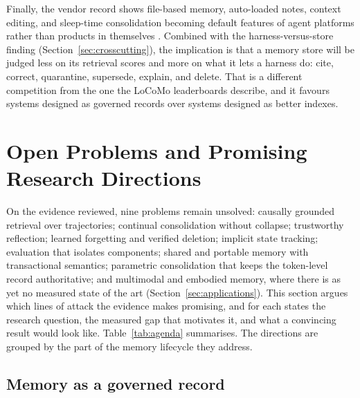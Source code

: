 \documentclass[11pt]{article}
\begin{document}
Finally, the vendor record shows file-based memory, auto-loaded notes, context editing, and sleep-time consolidation becoming default features of agent platforms rather than products in themselves \citep{anthropic2025memorytool,anthropic2026claudecode,letta2025filesystem}. Combined with the harness-versus-store finding (Section~\ref{sec:crosscutting}), the implication is that a memory store will be judged less on its retrieval scores and more on what it lets a harness do: cite, correct, quarantine, supersede, explain, and delete. That is a different competition from the one the LoCoMo leaderboards describe, and it favours systems designed as governed records over systems designed as better indexes.

\section{Open Problems and Promising Research Directions}
\label{sec:directions}

On the evidence reviewed, nine problems remain unsolved: causally grounded retrieval over trajectories; continual consolidation without collapse; trustworthy reflection; learned forgetting and verified deletion; implicit state tracking; evaluation that isolates components; shared and portable memory with transactional semantics; parametric consolidation that keeps the token-level record authoritative; and multimodal and embodied memory, where there is as yet no measured state of the art (Section~\ref{sec:applications}). This section argues which lines of attack the evidence makes promising, and for each states the research question, the measured gap that motivates it, and what a convincing result would look like. Table~\ref{tab:agenda} summarises. The directions are grouped by the part of the memory lifecycle they address.

\subsection{Memory as a governed record}
\end{document}
